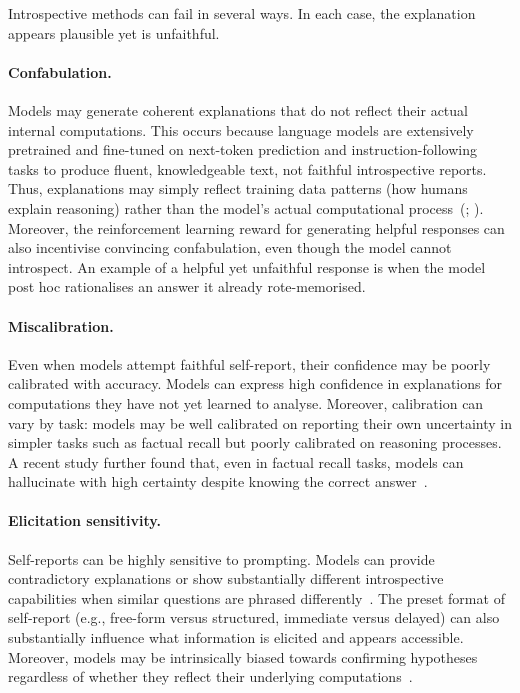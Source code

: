 \begin{warningbox}
Introspective methods can fail in several ways. In each case, the explanation appears plausible yet is unfaithful.\\

\paragraph{Confabulation.} Models may generate coherent explanations that do not reflect their actual internal computations. This occurs because language models are extensively pretrained and fine-tuned on next-token prediction and instruction-following tasks to produce fluent, knowledgeable text, not faithful introspective reports. Thus, explanations may simply reflect training data patterns (how humans explain reasoning) rather than the model's actual computational process~(; ). Moreover, the reinforcement learning reward for generating helpful responses can also incentivise convincing confabulation, even though the model cannot introspect. An example of a helpful yet unfaithful response is when the model post hoc rationalises an answer it already rote-memorised.\\

\paragraph{Miscalibration.} Even when models attempt faithful self-report, their confidence may be poorly calibrated with accuracy. Models can express high confidence in explanations for computations they have not yet learned to analyse. Moreover, calibration can vary by task: models may be well calibrated on reporting their own uncertainty in simpler tasks such as factual recall but poorly calibrated on reasoning processes. A recent study further found that, even in factual recall tasks, models can hallucinate with high certainty despite knowing the correct answer~.\\

\paragraph{Elicitation sensitivity.} Self-reports can be highly sensitive to prompting. Models can provide contradictory explanations or show substantially different introspective capabilities when similar questions are phrased differently~. The preset format of self-report (e.g., free-form versus structured, immediate versus delayed) can also substantially influence what information is elicited and appears accessible. Moreover, models may be intrinsically biased towards confirming hypotheses regardless of whether they reflect their underlying computations~.\\



\end{warningbox}
